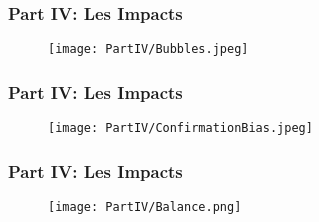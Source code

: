 \begin{frame}
    \frametitle{Part IV: Les Impacts}

    \begin{figure}
        \centering
        \texttt{[image: PartIV/Bubbles.jpeg]}
    \end{figure}

\end{frame}

\begin{frame}
    \frametitle{Part IV: Les Impacts}

    \begin{figure}
        \centering
        \texttt{[image: PartIV/ConfirmationBias.jpeg]}
    \end{figure}

\end{frame}

\begin{frame}
    \frametitle{Part IV: Les Impacts}

    \begin{figure}
        \centering
        \texttt{[image: PartIV/Balance.png]}
    \end{figure}

\end{frame}